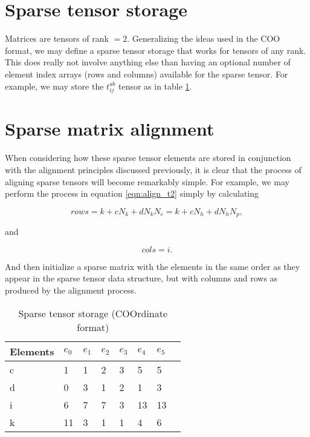 \section{Sparse tensor storage}

Matrices are tensors of rank $=2$. Generalizing the ideas used in the COO format, we may define a sparse tensor storage that works for tensors of any rank. This does really not involve anything else than having an optional number of element index arrays (rows and columns) available for the sparse tensor. For example, we may store the $t^{ab}_{ij}$ tensor as in table \ref{tab:flexmat_class}.

\section{Sparse matrix alignment}

When considering how these sparse tensor elements are stored in conjunction with the alignment principles discussed previously, it is clear that the process of aligning sparse tensors will become remarkably simple. For example, we may perform the process in equation \ref{eqn:align_t2} simply by calculating

\begin{equation}
rows = k + cN_k + dN_kN_c = k + cN_h + dN_hN_p,
\end{equation}

and

\begin{equation}
cols = i.
\end{equation}

And then initialize a sparse matrix with the elements in the same order as they appear in the sparse tensor data structure, but with columns and rows as produced by the alignment process. 


\begin{table}[]
\centering
\caption{Sparse tensor storage (COOrdinate format)}
\label{tab:flexmat_class}
\begin{tabular}{llllllll}
Elements & $e_0$ & $e_1$ & $e_2$ & $e_3$ & $e_4$ & $e_5$ \\ \hline
c          & 1 & 1 & 2 & 3 & 5 & 5 \\ \hline 
d    & 0 & 3 & 1 & 2 & 1 & 3 \\ \hline
i   & 6 & 7 & 7 & 3 & 13 & 13 \\ \hline
k    & 11 & 3 & 1& 1 & 4 & 6 \\ \hline
\end{tabular}
\end{table}



